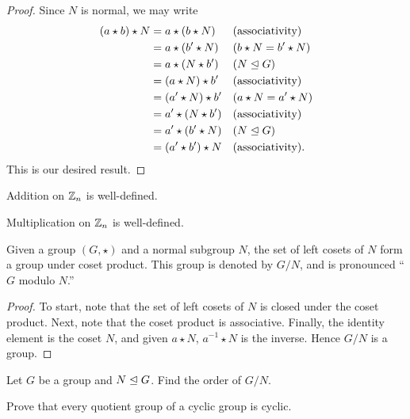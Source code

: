 \documentclass{ximera}
\begin{document}
\begin{lemma}
\begin{proof}
    Since $N$ is normal, we may write
    \begin{align*}
    (a\star b) \star N &= a\star(b\star N) & &\text{(associativity)}\\
    &= a\star ( b'\star N ) & &\text{($b\star N = b'\star N$)} \\
    &= a\star (N\star b') & &\text{($N\trianglelefteq G$)}\\
    &= (a\star N) \star b' & &\text{(associativity)}\\
    &= (a'\star N) \star b' & &\text{($a\star N = a'\star N$)} \\
    &= a' \star (N\star b') & &\text{(associativity)}\\
    &= a'\star (b'\star N) & &\text{($N\trianglelefteq G$)}\\
    &= (a'\star b')\star N & &\text{(associativity)}.
    \end{align*}
    This is our desired result.
  \end{proof}
\end{lemma}

\begin{corollary}
  Addition on $\mathbb Z_n$ is well-defined.
\end{corollary}


\begin{corollary}
  Multiplication on $\mathbb Z_n$ is well-defined.
\end{corollary}


\begin{theorem}
  Given a group $(G,\star)$ and a normal subgroup $N$, the set of left
  cosets of $N$ form a group under coset product. This group is
  denoted by $G/N$, and is pronounced ``$G$ modulo $N$.''
  \begin{proof}
    To start, note that the set of left cosets of $N$ is closed under
    the coset product. Next, note that the coset product is
    associative. Finally, the identity element is the coset $N$, and
    given $a\star N$, $a^{-1}\star N$ is the inverse. Hence $G/N$ is a
    group.
  \end{proof}
\end{theorem}

\begin{exercise}
  Let $G$ be a group and $N\trianglelefteq G$. Find the order of $G/N$.
\end{exercise}


\begin{exercise}
  Prove that every quotient group of a cyclic group is cyclic.
\end{exercise}
\end{document}
